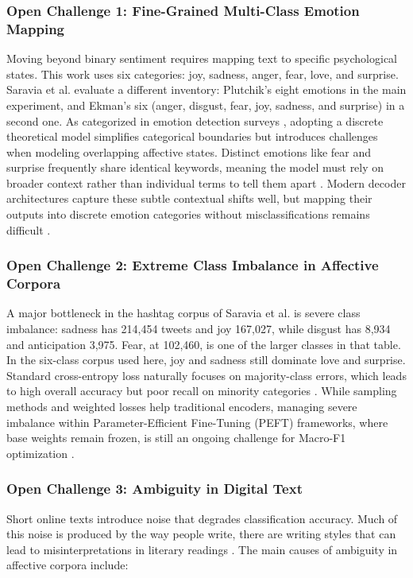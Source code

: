\documentclass[conference]{IEEEtran}
\begin{document}
\subsubsection{Open Challenge 1: Fine-Grained Multi-Class Emotion Mapping}
Moving beyond binary sentiment requires mapping text to specific psychological states. This work uses six categories: joy, sadness, anger, fear, love, and surprise. Saravia et al. \cite{saravia2018carer} evaluate a different inventory: Plutchik's eight emotions in the main experiment, and Ekman's six (anger, disgust, fear, joy, sadness, and surprise) in a second one. As categorized in emotion detection surveys \cite{maruf2024challenges}, adopting a discrete theoretical model simplifies categorical boundaries but introduces challenges when modeling overlapping affective states. Distinct emotions like fear and surprise frequently share identical keywords, meaning the model must rely on broader context rather than individual terms to tell them apart \cite{kratzwald2018deep}. Modern decoder architectures capture these subtle contextual shifts well, but mapping their outputs into discrete emotion categories without misclassifications remains difficult \cite{cheng2026personality}.

\subsubsection{Open Challenge 2: Extreme Class Imbalance in Affective Corpora}
A major bottleneck in the hashtag corpus of Saravia et al. \cite{saravia2018carer} is severe class imbalance: sadness has 214,454 tweets and joy 167,027, while disgust has 8,934 and anticipation 3,975. Fear, at 102,460, is one of the larger classes in that table. In the six-class corpus used here, joy and sadness still dominate love and surprise. Standard cross-entropy loss naturally focuses on majority-class errors, which leads to high overall accuracy but poor recall on minority categories \cite{maruf2024challenges}. While sampling methods and weighted losses help traditional encoders, managing severe imbalance within Parameter-Efficient Fine-Tuning (PEFT) frameworks, where base weights remain frozen, is still an ongoing challenge for Macro-F1 optimization \cite{nwaiwu2025peft}.

\subsubsection{Open Challenge 3: Ambiguity in Digital Text}
Short online texts introduce noise that degrades classification accuracy. Much of this noise is produced by the way people write, there are writing styles that can lead to misinterpretations in literary readings \cite{maruf2024challenges}. The main causes of ambiguity in affective corpora include:
\end{document}
